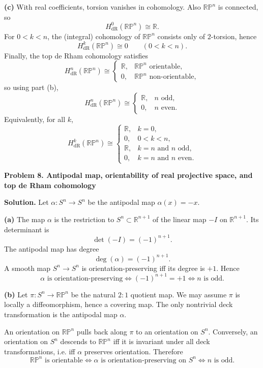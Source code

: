 \documentclass[12pt,a4paper]{article}
\theoremstyle{plain}
\theoremstyle{definition}      %
\begin{document}
	\textbf{(c)} With real coefficients, torsion vanishes in cohomology. Also $\mathbb{RP}^n$ is connected, so
	\[
	H^0_{\mathrm{dR}}(\mathbb{RP}^n)\cong \mathbb{R}.
	\]
	For $0<k<n$, the (integral) cohomology of $\mathbb{RP}^n$ consists only of $2$-torsion, hence
	\[
	H^k_{\mathrm{dR}}(\mathbb{RP}^n)\cong 0 \qquad (0<k<n).
	\]
	Finally, the top de Rham cohomology satisfies
	\[
	H^n_{\mathrm{dR}}(\mathbb{RP}^n)\cong
	\begin{cases}
		\mathbb{R}, & \mathbb{RP}^n \text{ orientable},\\
		0, & \mathbb{RP}^n \text{ non-orientable},
	\end{cases}
	\]
	so using part (b),
	\[
	H^n_{\mathrm{dR}}(\mathbb{RP}^n)\cong
	\begin{cases}
		\mathbb{R}, & n \text{ odd},\\
		0, & n \text{ even}.
	\end{cases}
	\]
	Equivalently, for all $k$,
	\[
	H^k_{\mathrm{dR}}(\mathbb{RP}^n)\cong
	\begin{cases}
		\mathbb{R}, & k=0,\\
		0, & 0<k<n,\\
		\mathbb{R}, & k=n \text{ and } n \text{ odd},\\
		0, & k=n \text{ and } n \text{ even}.
	\end{cases}
	\]
	
		\textbf{Problem 8. Antipodal map, orientability of real projective space, and top de Rham cohomology}
	
	\textbf{Solution.}
	Let $\alpha:S^n\to S^n$ be the antipodal map $\alpha(x)=-x$.
	
	\textbf{(a)} The map $\alpha$ is the restriction to $S^n\subset\mathbb{R}^{n+1}$ of the linear map $-I$ on $\mathbb{R}^{n+1}$.
	Its determinant is
	\[
	\det(-I)=(-1)^{n+1}.
	\]
	The antipodal map has degree
	\[
	\deg(\alpha)=(-1)^{n+1}.
	\]
	A smooth map $S^n\to S^n$ is orientation-preserving iff its degree is $+1$. Hence
	\[
	\alpha \text{ is orientation-preserving}
	\iff (-1)^{n+1}=+1
	\iff n \text{ is odd.}
	\]
	
	\textbf{(b)} Let $\pi:S^n\to \mathbb{RP}^n$ be the natural $2:1$ quotient map. We may assume $\pi$ is locally a diffeomorphism, hence a covering map.
	The only nontrivial deck transformation is the antipodal map $\alpha$.
	
	An orientation on $\mathbb{RP}^n$ pulls back along $\pi$ to an orientation on $S^n$.
	Conversely, an orientation on $S^n$ descends to $\mathbb{RP}^n$ iff it is invariant under all deck transformations, i.e. iff $\alpha$ preserves orientation.
	Therefore
	\[
	\mathbb{RP}^n \text{ is orientable}
	\iff \alpha \text{ is orientation-preserving on } S^n
	\iff n \text{ is odd.}
	\]
	
\end{document}
